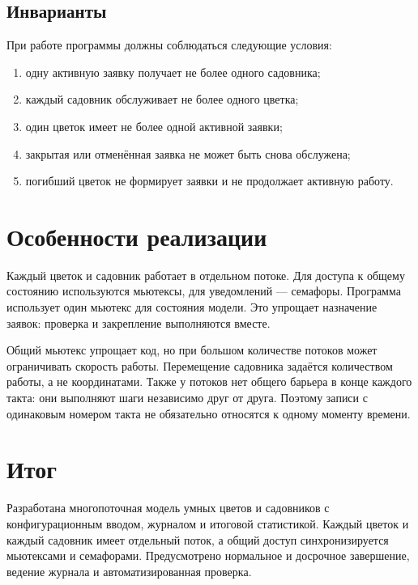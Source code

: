 \documentclass[12pt,a4paper]{article}
\begin{document}
\subsection{Инварианты}

При работе программы должны соблюдаться следующие условия:
\begin{enumerate}[noitemsep]
\item одну активную заявку получает не более одного садовника;
\item каждый садовник обслуживает не более одного цветка;
\item один цветок имеет не более одной активной заявки;
\item закрытая или отменённая заявка не может быть снова обслужена;
\item погибший цветок не формирует заявки и не продолжает активную работу.
\end{enumerate}

\section{Особенности реализации}

Каждый цветок и садовник работает в отдельном потоке. Для доступа к
общему состоянию используются мьютексы, для уведомлений --- семафоры.
Программа использует один мьютекс для состояния модели. Это упрощает
назначение заявок: проверка и закрепление выполняются вместе.

Общий мьютекс упрощает код, но при большом количестве потоков может
ограничивать скорость работы. Перемещение садовника задаётся количеством
работы, а не координатами. Также у потоков нет общего барьера в конце
каждого такта: они выполняют шаги независимо друг от друга. Поэтому
записи с одинаковым номером такта не обязательно относятся к одному
моменту времени.

\section{Итог}

Разработана многопоточная модель умных цветов и садовников
с конфигурационным вводом, журналом и итоговой статистикой. Каждый цветок и каждый садовник имеет отдельный
поток, а общий доступ синхронизируется мьютексами и семафорами.
Предусмотрено нормальное и досрочное завершение, ведение журнала и
автоматизированная проверка.
\end{document}
